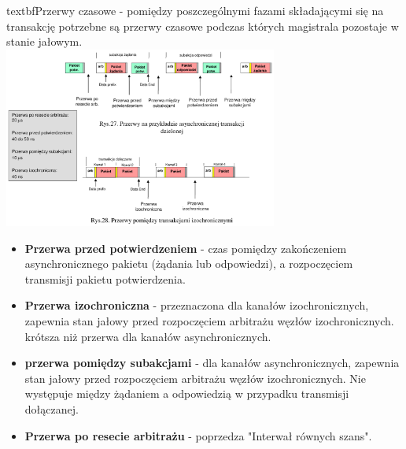 textbf{Przerwy czasowe} - pomiędzy poszczególnymi fazami składającymi się na transakcję potrzebne są przerwy czasowe podczas których magistrala pozostaje w stanie jałowym.\\
\includegraphics[width=9cm]{./wyklady/FIREWIRE_29_1.pdf}\\
\begin{itemize}
	\item \textbf{Przerwa przed potwierdzeniem} - czas pomiędzy zakończeniem asynchronicznego pakietu (żądania lub odpowiedzi), a rozpoczęciem transmisji pakietu potwierdzenia.
	\item \textbf{Przerwa izochroniczna} - przeznaczona dla kanałów izochronicznych, zapewnia stan jałowy przed rozpoczęciem arbitrażu węzłów izochronicznych. krótsza niż przerwa dla kanałów asynchronicznych.
	\item \textbf{przerwa pomiędzy subakcjami} - dla kanałów asynchronicznych, zapewnia stan jałowy przed rozpoczęciem arbitrażu węzłów izochronicznych. Nie występuje między żądaniem a odpowiedzią w przypadku transmisji dołączanej.
	\item \textbf{Przerwa po resecie arbitrażu} - poprzedza "Interwał równych szans".
\end{itemize}

